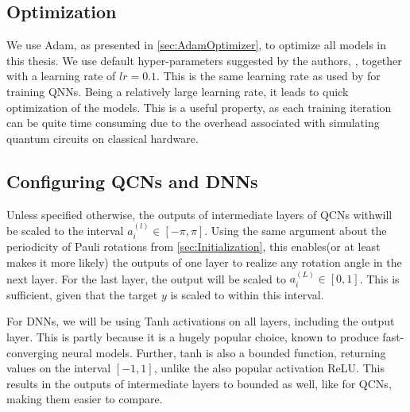 \subsection{Optimization}\label{sec:Optimization}
We use Adam, as presented in \autoref{sec:AdamOptimizer}, to optimize all models in this thesis. We use default hyper-parameters suggested by the authors, \citet{kingma2017adam}, together with a learning rate of $lr=0.1$. This is the same learning rate as used by \citet{abbas2020power} for training QNNs. Being a relatively large learning rate, it leads to quick optimization of the models. This is a useful property, as each training iteration can be quite time consuming due to the overhead associated with simulating quantum circuits on classical hardware.

\subsection{Configuring QCNs and DNNs}\label{sec:Configuring QCNs and DNNs}
Unless specified otherwise, the outputs of intermediate layers of QCNs withwill be scaled to the interval $a_i^{(l)} \in [-\pi, \pi]$. Using the same argument about the periodicity of Pauli rotations from \autoref{sec:Initialization}, this enables(or at least makes it more likely) the outputs of one layer to realize any rotation angle in the next layer. For the last layer, the output will be scaled to $a_i^{(L)} \in [0, 1]$. This is sufficient, given that the target $y$ is scaled to within this interval. 

For DNNs, we will be using Tanh activations on all layers, including the output layer. This is partly because it is a hugely popular choice, known to produce fast-converging neural models\cite{hands-on}. Further, tanh is also a bounded function, returning values on the interval $[-1, 1]$, unlike the also popular activation ReLU. This results in the outputs of intermediate layers to bounded as well, like for QCNs, making them easier to compare.





















